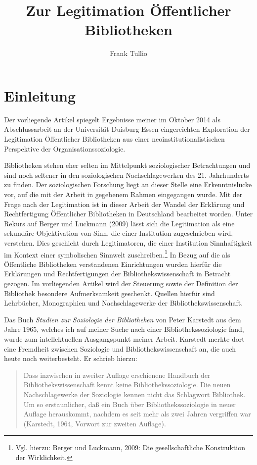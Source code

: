 \documentclass[a4paper,
fontsize=11pt,
oneside,
numbers=noperiodatend,
parskip=half-,
bibliography=totoc,
final
]{scrartcl}
\title{\LARGE{Zur Legitimation Öffentlicher Bibliotheken}} %
\author{Frank Tullio} %
\date{}
\begin{document}
\maketitle
\thispagestyle{fancyplain} 


\section*{Einleitung}\label{einleitung}

Der vorliegende Artikel spiegelt Ergebnisse meiner im Oktober 2014 als
Abschlussarbeit an der Universität Duisburg-Essen eingereichten
Exploration der Legitimation Öffentlicher Bibliotheken aus einer
neoinstitutionalistischen Perspektive der Organisationssoziologie.

Bibliotheken stehen eher selten im Mittelpunkt soziologischer
Betrachtungen und sind noch seltener in den soziologischen
Nachschlagewerken des 21. Jahrhunderts zu finden. Der soziologischen
Forschung liegt an dieser Stelle eine Erkenntnislücke vor, auf die mit
der Arbeit in gegebenem Rahmen eingegangen wurde. Mit der Frage nach der
Legitimation ist in dieser Arbeit der Wandel der Erklärung und
Rechtfertigung Öffentlicher Bibliotheken in Deutschland bearbeitet
worden. Unter Rekurs auf Berger und Luckmann (2009) lässt sich die
Legitimation als eine sekundäre Objektivation von Sinn, die einer
Institution zugeschrieben wird, verstehen. Dies geschieht durch
Legitimatoren, die einer Institution Sinnhaftigkeit im Kontext einer
symbolischen Sinnwelt zuschreiben.\footnote{Vgl. hierzu: Berger und
  Luckmann, 2009: Die gesellschaftliche Konstruktion der Wirklichkeit.}
In Bezug auf die als Öffentliche Bibliotheken verstandenen Einrichtungen
wurden hierfür die Erklärungen und Rechtfertigungen der
Bibliothekswissenschaft in Betracht gezogen. Im vorliegenden Artikel
wird der Steuerung sowie der Definition der Bibliothek besondere
Aufmerksamkeit geschenkt. Quellen hierfür sind Lehrbücher, Monographien
und Nachschlagewerke der Bibliothekswissenschaft.

Das Buch \emph{Studien zur Soziologie der Bibliotheken} von Peter
Karstedt aus dem Jahre 1965, welches ich auf meiner Suche nach einer
Bibliothekssoziologie fand, wurde zum intellektuellen Ausgangspunkt
meiner Arbeit. Karstedt merkte dort eine Fremdheit zwischen Soziologie
und Bibliothekswissenschaft an, die auch heute noch weiterbesteht. Er
schrieb hierzu:

\begin{quote}
Dass inzwischen in zweiter Auflage erschienene Handbuch der
Bibliothekswissenschaft kennt keine Bibliothekssoziologie. Die neuen
Nachschlagewerke der Soziologie kennen nicht das Schlagwort Bibliothek.
Um so erstaunlicher, daß ein Buch über Bibliothekssoziologie in neuer
Auflage herauskommt, nachdem es seit mehr als zwei Jahren vergriffen war
(Karstedt, 1964, Vorwort zur zweiten Auflage).
\end{quote}
\end{document}
